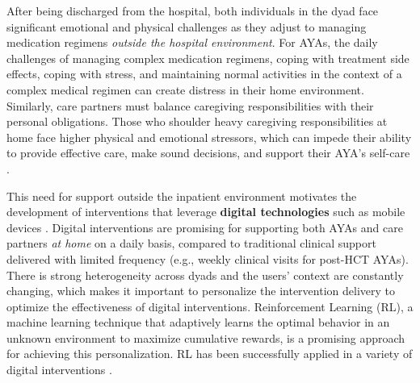After being discharged from the hospital, both individuals in the dyad face significant emotional and physical challenges as they adjust to managing medication regimens \textit{outside the hospital environment}.
For AYAs, the daily challenges of managing complex medication regimens, coping with treatment side effects, coping with stress, and maintaining normal activities in the context of a complex medical regimen can create distress in their home environment. Similarly, care partners must balance caregiving responsibilities with their personal obligations. Those who shoulder heavy caregiving responsibilities at home face higher physical and emotional stressors, which can impede their ability to provide effective care, make sound decisions, and support their AYA's  self-care \cite{reinhard2008supporting}.


This need for support outside the inpatient environment motivates the development of interventions that leverage \textbf{digital technologies} such as mobile devices \cite{uribe2023effectiveness}.
Digital interventions are promising for supporting both AYAs and care partners \textit{at home} on a daily basis, compared to traditional clinical support delivered with limited frequency (e.g., weekly clinical visits for post-HCT AYAs). There is strong heterogeneity across dyads and the users' context are constantly changing, which makes it important to personalize the intervention delivery to optimize the effectiveness of digital interventions.
Reinforcement Learning (RL), a machine learning technique that adaptively learns the optimal behavior in an unknown environment to maximize cumulative rewards, is a promising approach for achieving this personalization.
RL has been successfully applied in a variety of digital interventions \cite{liao2020personalized,battalio2021sense2stop,trella2024deployed,ghosh2024miwaves}.

